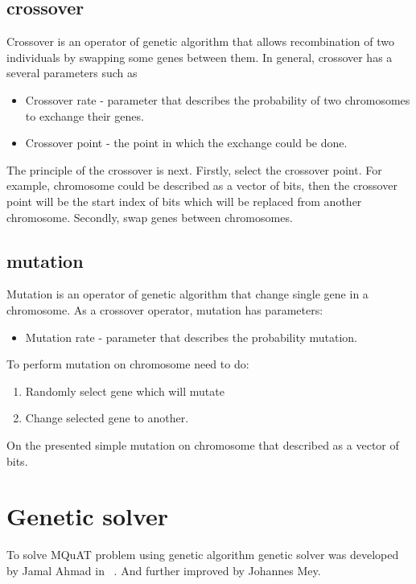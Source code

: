 \subsection{crossover}
Crossover is an operator of genetic algorithm that allows recombination of two individuals by swapping some genes between them.
In general, crossover has a several parameters such as
\begin{itemize}
	\item Crossover rate - parameter that describes the probability of two chromosomes to exchange their genes.
	\item Crossover point - the point in which the exchange could be done.
\end{itemize}

The principle of the crossover is next.
Firstly, select the crossover point. For example, chromosome could be described as a vector of bits, then the crossover point will be the start index of bits which will be replaced from another chromosome.
Secondly, swap genes between chromosomes.


\subsection{mutation}

Mutation is an operator of genetic algorithm that change single gene in a chromosome. As a crossover operator, mutation has parameters:

\begin{itemize}
	\item Mutation rate - parameter that describes the probability mutation.
\end{itemize}

To perform mutation on chromosome need to do:
\begin{enumerate}
	\item Randomly select gene which will mutate
	\item Change selected gene to another.
\end{enumerate}

On the  presented simple mutation on chromosome that described as a vector of bits.


\section{Genetic solver}
To solve MQuAT problem using genetic algorithm genetic solver was developed by Jamal Ahmad in ~\cite{ahmad18}. And further improved by Johannes Mey.

